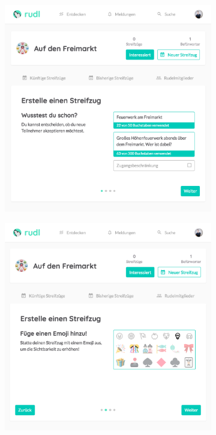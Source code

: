 \documentclass[12pt,numbers=noenddot,parskip,bibliography=totocnumbered,listof=totocnumbered]{scrreprt}
\begin{document}
\begin{figure}
\begin{subfigure}[t]{0.45\textwidth}
\centering
\includegraphics[width=\linewidth]{createexpedition0.png}
\caption{}
\label{createexpedition0}
\end{subfigure}
\hfill
\begin{subfigure}[t]{0.45\textwidth}
\centering
\includegraphics[width=\linewidth]{createexpedition1.png}
\caption{}
\label{createexpedition1}
\end{subfigure}


\end{figure}
\end{document}
